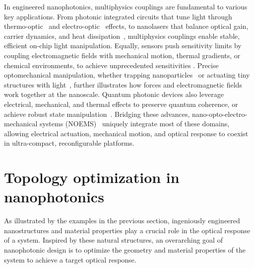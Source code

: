 In engineered nanophotonics, multiphysics couplings are fundamental to various key applications. From photonic integrated circuits that tune light through  
thermo-optic~\cite{TOPS_1, TOPS_2, TOPS_3, program, PIC} and electro-optic~\cite{modu, modu1, modu2, pockels} effects, to nanolasers that balance optical gain, carrier dynamics, and heat dissipation~\cite{laser,laser_pic}, multiphysics couplings enable stable, efficient on-chip light manipulation. Equally, sensors  
push sensitivity limits by coupling electromagnetic fields with mechanical motion, thermal gradients, or chemical environments, to achieve unprecedented sensitivities \cite{therm_sensing,sensing, weakforce}.
Precise optomechanical manipulation, wheth\-er trapping nanoparticles~\cite{ashkin_acceleration_1970} or actuating tiny structures with light~\cite{ivanyi_optically_2024}, further illustrates how forces and electromagnetic fields work together at the nanoscale. Quantum photonic devices 
also leverage electrical, mechanical, and thermal effects to preserve quantum coherence, or achieve robust state manipulation~\cite{quant_eo, Andrews_2014, Xi_2025}. Bridging these advances, nano-opto-electro-mechanical systems (NOEMS)~\cite{NOEMS} uniquely integrate most of these  
domains, allowing electrical actuation, mechanical motion, and optical response to coexist in ultra-compact, reconfigurable platforms. 



\section{Topology optimization in nanophotonics}\label{intro:to}

As illustrated by the examples in the previous section, ingeniously engineered nanostructures and material properties play a crucial role in the
optical response of a system. Inspired by these natural structures, an overarching goal of nanophotonic
design is to optimize the geometry and material properties of the system to achieve a target
optical response.


